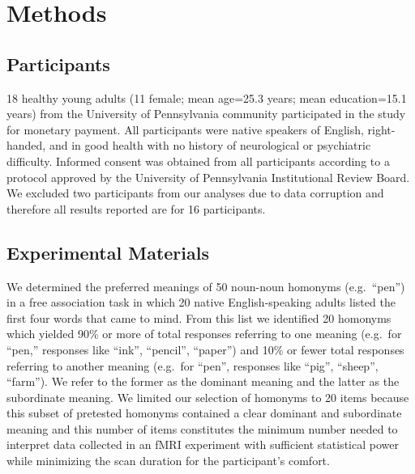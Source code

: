 \documentclass[final,authoryear,5p,times,twocolumn]{elsarticle}
\begin{document}
\section{Methods}
\subsection{Participants}
18 healthy young adults (11 female; mean age=25.3 years; mean education=15.1 years) from the University of Pennsylvania community participated in the study for monetary payment.  All participants were native speakers of English, right-handed, and in good health with no history of neurological or psychiatric difficulty.  Informed consent was obtained from all participants according to a protocol approved by the University of Pennsylvania Institutional Review Board.  We excluded two participants from our analyses due to data corruption and therefore all results reported are for 16 participants. 

\subsection{Experimental Materials}
We determined the preferred meanings of 50 noun-noun homonyms (e.g.\ “pen”) in a free association task in which 20 native English-speaking adults listed the first four words that came to mind.  From this list we identified 20 homonyms which yielded 90\% or more of total responses referring to one meaning (e.g.\ for “pen,” responses like “ink”, “pencil”, “paper”) and 10\% or fewer total responses referring to another meaning (e.g.\ for “pen”, responses like “pig”, “sheep”, “farm”). We refer to the former as the dominant meaning and the latter as the subordinate meaning.  We limited our selection of homonyms to 20 items because this subset of pretested homonyms contained a clear dominant and subordinate meaning and this number of items constitutes the minimum number needed to interpret data collected in an fMRI experiment with sufficient statistical power while minimizing the scan duration for the participant’s comfort.
\end{document}

